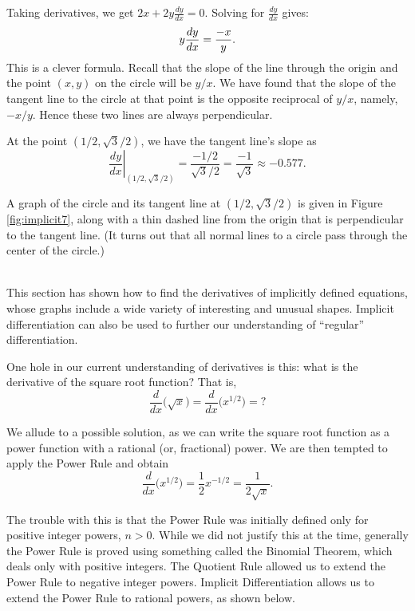 {%
Taking derivatives, we get $2x+2y\frac{dy}{dx}=0$.  Solving for $\frac{dy}{dx}$  gives: $$\displaystyle y\frac{dy}{dx} = \frac{-x}{y}.$$ 
This is a clever formula. Recall that the slope of the line through the origin and the point $(x,y)$ on the circle will be $y/x$. We have found that the slope of the tangent line to the circle at that point is the opposite reciprocal of $y/x$, namely, $-x/y$. Hence these two lines are always perpendicular.

At the point $(1/2, \sqrt{3}/2)$, we have the tangent line's slope as
$$\left.\frac{dy}{dx}\right|_{(1/2, \sqrt{3}/2)} = \frac{-1/2}{\sqrt{3}/2} = \frac{-1}{\sqrt{3}} \approx -0.577.$$

A graph of the circle and its tangent line at $(1/2,\sqrt{3}/2)$ is given in Figure \ref{fig:implicit7}, along with a thin dashed line from the origin that is perpendicular to the tangent line. (It turns out that all normal lines to a circle pass through the center of the circle.)
}\\

This section has shown how to find the derivatives of implicitly defined equations, whose graphs include a wide variety of interesting and unusual shapes. Implicit differentiation can also be used to further our understanding of ``regular'' differentiation. 

One hole in our current understanding of derivatives is this: what is the derivative of the square root function? That is, $$\frac{d}{dx}\big(\sqrt{x}\big) = \frac{d}{dx}\big(x^{1/2}\big) = \text{?}$$

We allude to a possible solution, as we can write the square root function as a power function with a rational (or, fractional) power. We are then tempted to apply the Power Rule and obtain $$\frac{d}{dx}\big(x^{1/2}\big) = \frac12x^{-1/2} = \frac{1}{2\sqrt{x}}.$$

The trouble with this is that the Power Rule was initially defined only for positive integer powers, $n>0$. While we did not justify this at the time, generally the Power Rule is proved using something called the Binomial Theorem, which deals only with positive integers. The Quotient Rule allowed us to extend the Power Rule to negative integer powers. Implicit Differentiation allows us to extend the Power Rule to rational powers, as shown below.

